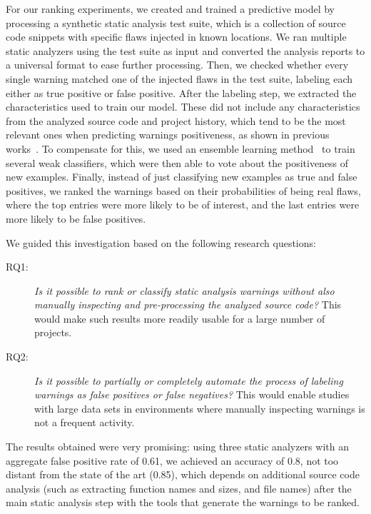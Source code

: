 
For our ranking experiments, we created and trained a
predictive model by processing a synthetic static analysis test
suite, which is a collection of source code snippets with specific flaws
injected in known locations. We ran multiple static analyzers using the test
suite as input and converted the analysis reports to a universal format to
ease further processing.
Then, we checked whether every single warning matched one of the injected flaws in
the test suite, labeling each either as true positive or
false positive. After the labeling step, we extracted the
characteristics used to train our model. These did not include
any characteristics from the analyzed source code and project history, which
tend to be the most relevant ones when predicting warnings positiveness, as
shown in previous works~\citep{yoon2014reducing, jung2005taming}. To compensate
for this, we used an ensemble learning method~\citep{aima} to train several
weak classifiers, which were then able to vote about the positiveness of new examples.
Finally, instead of just classifying new examples as true and false positives,
we ranked the warnings based on their probabilities of being real flaws, where
the top entries were more likely to be of interest, and the last entries were more
likely to be false positives.

We guided this investigation based on the following research questions:

\begin{description}
  \item [RQ1:] \textit{Is it possible to rank or classify static analysis warnings without also
  manually inspecting and pre-processing the analyzed source code?} This would make
  such results more readily usable for a large number of projects.

  \item [RQ2:] \textit{Is it possible to partially or completely automate the process of
    labeling warnings as false positives or false negatives?} This would enable
    studies with large data sets in environments where manually inspecting
    warnings is not a frequent activity.
\end{description}

The results obtained were very promising: using three static analyzers with an
aggregate false positive rate of 0.61, we achieved an accuracy of 0.8, not too
distant from the state of the art (0.85), which depends on additional source
code analysis (such as extracting function names and sizes, and file names)
after the main static analysis step with the tools that generate the warnings
to be ranked.

